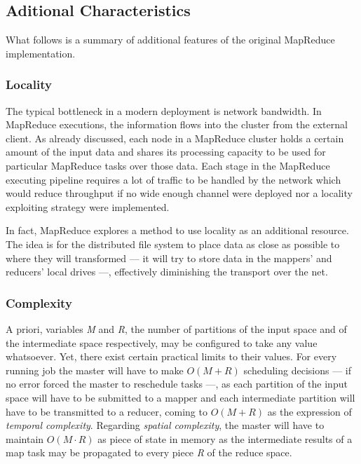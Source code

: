 \subsection{Aditional Characteristics}\label{subsec:caracteristicasadicionales}

\noindent What follows is a summary of additional features of the original MapReduce implementation.

\subsubsection{Locality}\label{subsubsec:localidad}

\noindent The typical bottleneck in a modern deployment is network bandwidth. In MapReduce executions, the information flows into the cluster from the external client. As already discussed, each node in a MapReduce cluster holds a certain amount of the input data and shares its processing capacity to be used for particular MapReduce tasks over those data. Each stage in the MapReduce executing pipeline requires a lot of traffic to be handled by the network which would reduce throughput if no wide enough channel were deployed nor a locality exploiting strategy were implemented.

In fact, MapReduce explores a method to use locality as an additional resource. The idea is for the distributed file system to place data as close as possible to where they will transformed --- it will try to store data in the mappers' and reducers' local drives ---, effectively diminishing the transport over the net.

\subsubsection{Complexity}\label{subsubsec:complejidad}

\noindent A priori, variables \emph{M} and \emph{R}, the number of partitions of the input space and of the intermediate space respectively, may be configured to take any value whatsoever. Yet, there exist certain practical limits to their values. For every running job the master will have to make $O(M + R)$ scheduling decisions --- if no error forced the master to reschedule tasks ---, as each partition of the input space will have to be submitted to a mapper and each intermediate partition will have to be transmitted to a reducer, coming to $O(M + R)$ as the expression of \emph{temporal complexity}. Regarding \emph{spatial complexity}, the master will have to maintain $O(M \cdot R)$ as piece of state in memory as the intermediate results of a map task may be propagated to every piece \emph{R} of the reduce space.

